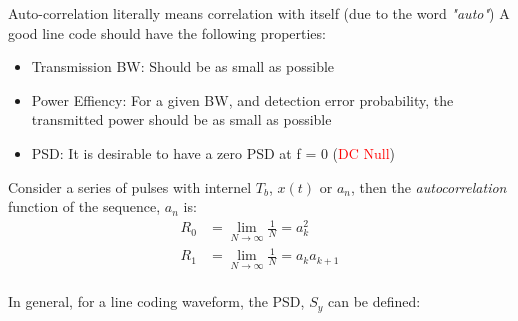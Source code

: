 \documentclass[a4paper,11pt]{article}
\begin{document}
Auto-correlation literally means correlation with itself (due to the word \textit{"auto"})
A good line code should have the following properties:
\begin{itemize}
    \item Transmission BW: Should be as small as possible
    \item Power Effiency: For a given BW, and detection error probability, the transmitted power should be as small as possible
    \item PSD: It is desirable to have a zero PSD at f = 0 (\textcolor{red}{DC Null})
\end{itemize}


Consider a series of pulses with internel $T_{b}$, $x(t)$ or $a_{n}$, then the \textit{autocorrelation} function of the sequence, $a_{n}$ is:
$$
    \begin{aligned}
        R_{0} & = \lim_{N\to \infty} \frac{1}{N} = a^{2}_k     \\
        R_{1} & = \lim_{N\to \infty} \frac{1}{N} = a_k a_{k+1} \\
    \end{aligned}
$$

In general, for a line coding waveform, the PSD, $S_{y}$ can be defined:


\end{document}
